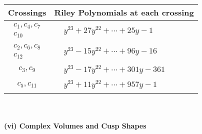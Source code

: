 \documentclass[1p]{elsarticle_modified}
\theoremstyle{definition}
\begin{document}
\begin{tabular}{m{50pt}|m{274pt}}
Crossings & \hspace{64pt}Riley Polynomials at each crossing \\
\hline $$\begin{aligned}c_{1},c_{4},c_{7}\\c_{10}\end{aligned}$$&$\begin{aligned}
&y^{23}+27 y^{22}+\cdots+25 y-1
\end{aligned}$\\
\hline $$\begin{aligned}c_{2},c_{6},c_{8}\\c_{12}\end{aligned}$$&$\begin{aligned}
&y^{23}-15 y^{22}+\cdots+96 y-16
\end{aligned}$\\
\hline $$\begin{aligned}c_{3},c_{9}\end{aligned}$$&$\begin{aligned}
&y^{23}-17 y^{22}+\cdots+301 y-361
\end{aligned}$\\
\hline $$\begin{aligned}c_{5},c_{11}\end{aligned}$$&$\begin{aligned}
&y^{23}+11 y^{22}+\cdots+957 y-1
\end{aligned}$\\
\hline
\end{tabular}\\~\\
\newpage\flushleft \textbf{(vi) Complex Volumes and Cusp Shapes}
\end{document}
